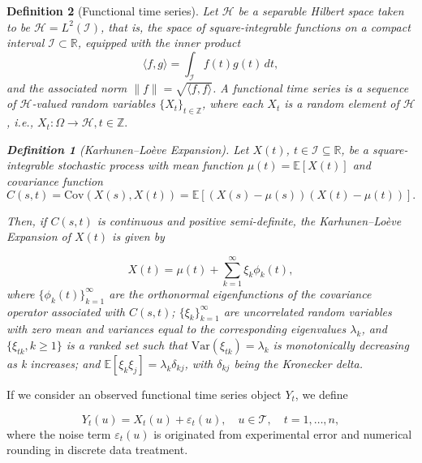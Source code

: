 \documentclass[
	12pt,				%
	oneside,			%
	a4paper,			%
	english,			%
	brazil				%
	]{abntex2ppgsi}
\newtheorem{definition}{Definition}
\begin{document}
\begin{definition}[Functional time series]
Let $\mathcal{H}$ be a separable Hilbert space taken to be $\mathcal{H} = L^2(\mathcal{I})$, that is, the space of square-integrable functions on a compact interval $\mathcal{I} \subset \mathbb{R}$, equipped with the inner product
\begin{equation}
\langle f, g \rangle = \int_{\mathcal{I}} f(t) g(t) \, dt,
\end{equation}
and the associated norm $\|f\| = \sqrt{\langle f, f \rangle}$. A \emph{functional time series} is a sequence of $\mathcal{H}$-valued random variables $\{X_t\}_{t \in \mathbb{Z}}$, where each $X_t$ is a random element of $\mathcal{H}$, i.e., $X_t : \Omega \to \mathcal{H}, t \in \mathbb{Z}.$

\begin{definition}[Karhunen–Loève Expansion]
Let \( X(t) \), \( t \in \mathcal{I} \subseteq \mathbb{R} \), be a square-integrable stochastic process with mean function \( \mu(t) = \mathbb{E}[X(t)] \) and covariance function 
\begin{equation}
C(s, t) = \text{Cov}(X(s), X(t)) = \mathbb{E}[(X(s) - \mu(s))(X(t) - \mu(t))].
\end{equation}

Then, if \( C(s, t) \) is continuous and positive semi-definite, the Karhunen--Lo\`eve Expansion of \( X(t) \) is given by

\begin{equation}
X(t) = \mu(t) + \sum_{k=1}^\infty \xi_k \phi_k(t),
\label{eq:kl_decomp}
\end{equation}
where \( \{ \phi_k(t) \}_{k=1}^\infty \) are the orthonormal eigenfunctions of the covariance operator associated with \( C(s, t) \); \( \{ \xi_k \}_{k=1}^\infty \) are uncorrelated random variables with zero mean and variances equal to the corresponding eigenvalues \( \lambda_k \), and $\{\xi_{tk},k\geq1\}$ is a ranked set such that $\text{Var}(\xi_{tk})=\lambda_k$ is monotonically decreasing as k increases; and \( \mathbb{E}[\xi_k \xi_j] = \lambda_k \delta_{kj} \), with \( \delta_{kj} \) being the Kronecker delta.
\end{definition}

\end{definition}

If we consider an observed functional time series object $Y_t$, we define

\begin{equation}
     Y_t(u) = X_t(u) + \varepsilon_t(u), \quad u \in \mathcal{T}, \quad t = 1, \dots, n,
\label{eq:observed_ts}
\end{equation}
where the noise term $\varepsilon_t(u)$ is originated from experimental error and numerical rounding in discrete data treatment.
\end{document}
